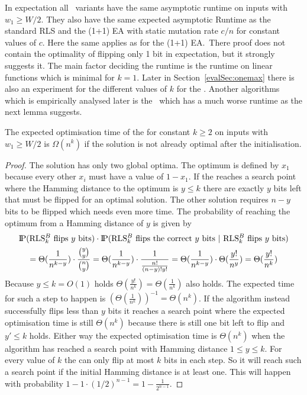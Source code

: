 In expectation all \RLSR~variants have the same asymptotic runtime on inputs with $w_1\ge W/2$.
They also have the same expected asymptotic Runtime as the standard RLS and the (1+1) EA with static mutation rate $c/n$ for constant values of $c$.
Here the same applies as for the (1+1) EA.\
There proof does not contain the optimality of flipping only 1 bit in expectation, but it strongly suggests it.
The main factor deciding the runtime is the runtime on linear functions which is minimal for $k=1$.
Later in Section~\ref{evalSec:onemax} there is also an experiment for the different values of $k$ for the \RLSR[k].
Another algorithms which is empirically analysed later is the \RLSN~which has a much worse runtime as the next lemma suggests.

\begin{lemma}\label{lemma:RLSNBad}
    The expected optimisation time of the \RLSN[k] for constant $k\ge2$ on inputs with $w_1\ge W/2$ is $\Omega(n^k)$ if the solution is not already optimal after the initialisation.
\end{lemma}
\begin{proof}
    The solution has only two global optima.
    The optimum is defined by $x_1$ because every other $x_i$ must have a value of $1-x_1$.
    If the \RLSN[k] reaches a search point where the Hamming distance to the optimum is $y\le k$ there are exactly $y$ bits left that must be flipped for an optimal solution.
    The other solution requires $n-y$ bits to be flipped which needs even more time.
    The probability of reaching the optimum from a Hamming distance of $y$ is given by
    \begin{gather}\nonumber
        \probP(\text{\RLSN[k] flips $y$ bits})\cdot\probP(\text{\RLSN[k] flips the correct $y$ bits | \RLSN[k] flips $y$ bits})\\ \nonumber
        =  \Theta(\frac{1}{n^{k-y}}) \cdot \frac{\binom{y}{y}}{\binom{n}{y}}
        =  \Theta(\frac{1}{n^{k-y}}) \cdot \frac{1}{\frac{n!}{(n-y)!y!}}
        =  \Theta(\frac{1}{n^{k-y}}) \cdot \Theta(\frac{y!}{n^y})
        =  \Theta(\frac{y!}{n^{k}})
    \end{gather}
    Because $y\le k = O(1)$ holds $\Theta(\frac{y!}{n^{k}})=\Theta(\frac{1}{n^{k}})$ also holds.
    The expected time for such a step to happen is ${(\Theta(\frac{1}{n^{k}}))}^{-1}=\Theta(n^{k})$.
    If the algorithm instead successfully flips less than $y$ bits it reaches a search point where the expected optimisation time is still $\Theta(n^{k})$ because there is still one bit left to flip and $y'\le k$ holds.
    Either way the expected optimisation time is $\Theta(n^{k})$ when the algorithm has reached a search point with Hamming distance $1\le y\le k$.
    For every value of $k$ the \RLSN[k] can only flip at most $k$ bits in each step.
    So it will reach such a search point if the initial Hamming distance is at least one.
    This will happen with probability $1-1\cdot{(1/2)}^{n-1}=1-\frac{1}{2^{n-1}}$.
\end{proof}

